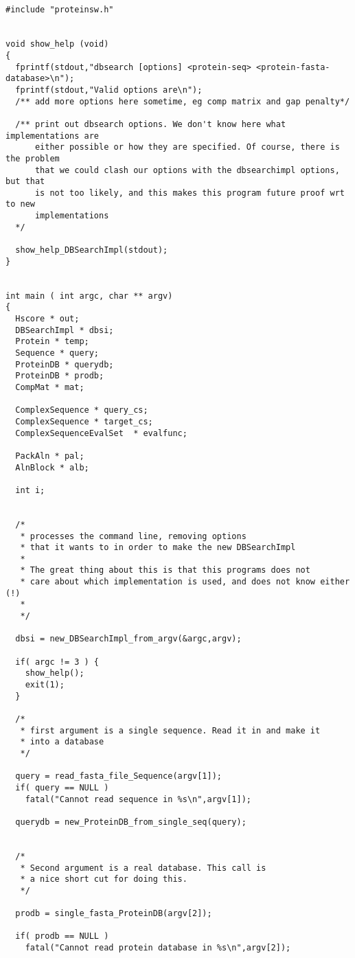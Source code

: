 \begin{verbatim}


#include "proteinsw.h"


void show_help (void)
{
  fprintf(stdout,"dbsearch [options] <protein-seq> <protein-fasta-database>\n");
  fprintf(stdout,"Valid options are\n");
  /** add more options here sometime, eg comp matrix and gap penalty*/

  /** print out dbsearch options. We don't know here what implementations are
      either possible or how they are specified. Of course, there is the problem
      that we could clash our options with the dbsearchimpl options, but that
      is not too likely, and this makes this program future proof wrt to new
      implementations
  */

  show_help_DBSearchImpl(stdout);
}

  
int main ( int argc, char ** argv) 
{
  Hscore * out;
  DBSearchImpl * dbsi;
  Protein * temp;
  Sequence * query;
  ProteinDB * querydb;
  ProteinDB * prodb;
  CompMat * mat;

  ComplexSequence * query_cs;
  ComplexSequence * target_cs;
  ComplexSequenceEvalSet  * evalfunc;

  PackAln * pal;
  AlnBlock * alb;

  int i;


  /*
   * processes the command line, removing options
   * that it wants to in order to make the new DBSearchImpl
   *
   * The great thing about this is that this programs does not
   * care about which implementation is used, and does not know either (!)
   *
   */

  dbsi = new_DBSearchImpl_from_argv(&argc,argv);

  if( argc != 3 ) {
    show_help();
    exit(1);
  }

  /*
   * first argument is a single sequence. Read it in and make it
   * into a database
   */

  query = read_fasta_file_Sequence(argv[1]);
  if( query == NULL ) 
    fatal("Cannot read sequence in %s\n",argv[1]);
  
  querydb = new_ProteinDB_from_single_seq(query);


  /*
   * Second argument is a real database. This call is
   * a nice short cut for doing this.
   */

  prodb = single_fasta_ProteinDB(argv[2]);

  if( prodb == NULL )
    fatal("Cannot read protein database in %s\n",argv[2]);



\end{verbatim}
